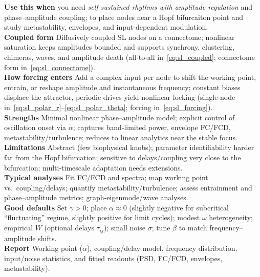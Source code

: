 \documentclass[12pt]{article}
\numberwithin{equation}{section}
\begin{document}
\begin{tcolorbox}[
  colback=gray!5,
  colframe=slate,
  colbacktitle=softblue!25,
  coltitle=softblue!60!black,
  fonttitle=\bfseries\small,
  title={\small When to Use It},
  boxrule=0.4pt, enhanced, sharp corners,
  left=4pt,right=4pt,top=3pt,bottom=3pt,
  boxsep=2pt, before skip=6pt, after skip=6pt
]
\scriptsize
\textbf{Use this when} you need \emph{self‑sustained rhythms with amplitude regulation} and phase–amplitude coupling; to place nodes near a Hopf bifurcaiton point and study metastability, envelopes, and input‑dependent modulation.\\
\textbf{Coupled form} Diffusively coupled SL nodes on a connectome; nonlinear saturation keeps amplitudes bounded and supports synchrony, clustering, chimeras, waves, and amplitude death (all‑to‑all in~\eqref{eq:sl_coupled}; connectome form in~\eqref{eq:sl_connectome}).\\
\textbf{How forcing enters} Add a complex input per node to shift the working point, entrain, or reshape amplitude and instantaneous frequency; constant biases displace the attractor, periodic drives yield nonlinear locking (single‑node in~\eqref{eq:sl_polar_r}–\eqref{eq:sl_polar_theta}; forcing in~\eqref{eq:sl_forcing}).\\
\textbf{Strengths} Minimal nonlinear phase–amplitude model; explicit control of oscillation onset via $\alpha$; captures band‑limited power, envelope FC/FCD, metastability/turbulence; reduces to linear analytics near the stable focus.\\
\textbf{Limitations} Abstract (few biophysical knobs); parameter identifiability harder far from the Hopf bifurcation; sensitive to delays/coupling very close to the bifurcation; multi‑timescale adaptation needs extensions.\\
\textbf{Typical analyses} Fit FC/FCD and spectra; map working point vs.\ coupling/delays; quantify metastability/turbulence; assess entrainment and phase–amplitude metrics; graph‑eigenmode/wave analyses.\\
\textbf{Good defaults} Set $\gamma>0$; place $\alpha\approx 0$ (slightly negative for subcritical “fluctuating” regime, slightly positive for limit cycles); modest $\omega$ heterogeneity; empirical $W$ (optional delays $\tau_{ij}$); small noise $\sigma$; tune $\beta$ to match frequency–amplitude shifts.\\
\textbf{Report} Working point ($\alpha$), coupling/delay model, frequency distribution, input/noise statistics, and fitted readouts (PSD, FC/FCD, envelopes, metastability).
\end{tcolorbox}
\end{document}
